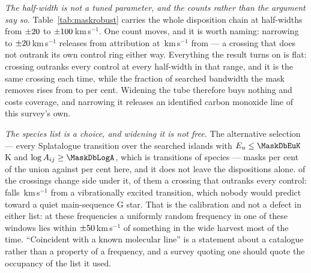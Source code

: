 \emph{The half-width is not a tuned parameter, and the counts rather than
the argument say so.} Table~\ref{tab:maskrobust} carries the whole
disposition chain at half-widths from $\pm20$ to
$\pm100$\,km\,s$^{-1}$. One count moves, and it is worth naming:
narrowing to $\pm20$\,km\,s$^{-1}$ releases \FrNarrowMoveStar{}
from attribution at \FrNarrowMoveDv\,km\,s$^{-1}$ from
\FrNarrowMoveLine{} --- a crossing that does not outrank its own control
ring either way. Everything the result turns on is flat: \FrNRankPass{}
crossing outranks every control at every half-width in that range, and it is
the same crossing each time, while the fraction of searched bandwidth the
mask removes rises from \FrMaskPctLo{} to \FrMaskPctHi{} per cent. Widening
the tube therefore buys nothing and costs coverage, and narrowing it
releases an identified carbon monoxide line of this survey's own.

\begin{table}
\centering
\footnotesize
\caption{The disposition chain against the mask half-width, in the stellar
rest frame. All \NCross{} crossings are classified at every half-width: the
second column is what the mask costs in searched bandwidth and the rest is
what it decides, ending in how many unattributed crossings outrank all
\NCtrl{} controls and how many of \emph{those} recur at a later epoch.
Adopted half-width in bold.}
\label{tab:maskrobust}

\end{table}

\emph{The species list is a choice, and widening it is not free.} The
alternative selection --- every Splatalogue transition over the
\UnionIntervals{} searched islands with $E_{\rm u}\le\MaskDbEuK$\,K and
$\log A_{ij}\ge\MaskDbLogA$, which is \MaskDbTrans{} transitions of
\MaskDbCarriers{} species --- masks \MaskDbPctUnion{} per cent of the union
against \FrMaskPct{} per cent here, and it does not leave the dispositions
alone. \FrFullNFlip{} of the \NCross{} crossings change side under it,
\FrFullNFlipRankWord{} of them a crossing that outranks every control:
\FrFullFlipRankStar{} falls \FrFullFlipRankDv\,km\,s$^{-1}$ from a
vibrationally excited \FrFullFlipRankChem{} transition, which nobody would
predict toward a quiet main-sequence G star. That is the calibration and not
a defect in either list: at these frequencies a uniformly random frequency
in one of these windows lies within $\pm50$\,km\,s$^{-1}$ of
something in the wide harvest most of the time. ``Coincident with a known
molecular line'' is a statement about a catalogue rather than a property of
a frequency, and a survey quoting one should quote the occupancy of the list
it used.

